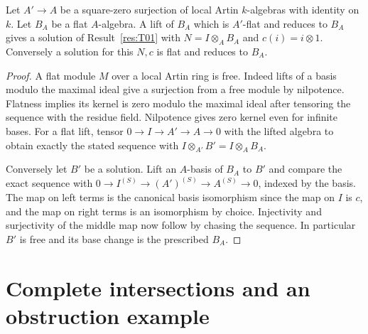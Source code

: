 \begin{lemma}\label{res:T03}
Let \(A'\to A\) be a square-zero surjection of local Artin
\(k\)-algebras with identity on \(k\). Let \(B_A\) be a flat
\(A\)-algebra. A lift of \(B_A\) which is \(A'\)-flat and reduces
to \(B_A\) gives a solution of Result~\ref{res:T01} with
\(N=I\otimes_A B_A\) and \(c(i)=i\otimes1\). Conversely a
solution for this \(N,c\) is flat and reduces to \(B_A\).
\end{lemma}
\begin{proof}
A flat module \(M\) over a local Artin ring is free. Indeed lifts
of a basis modulo the maximal ideal give a surjection from a free
module by nilpotence. Flatness implies its kernel is zero modulo
the maximal ideal after tensoring the sequence with the residue
field. Nilpotence gives zero kernel even for infinite bases.
For a flat lift, tensor \(0\to I\to A'\to A\to0\) with the lifted
algebra to obtain exactly the stated sequence with
\(I\otimes_{A'} B'=I\otimes_A B_A\).

Conversely let \(B'\) be a solution. Lift an \(A\)-basis of \(B_A\)
to \(B'\) and compare the exact sequence with
\(0\to I^{(S)}\to (A')^{(S)}\to A^{(S)}\to0\), indexed by the basis.
The map on left terms is the canonical basis isomorphism since
the map on \(I\) is \(c\), and the map on right terms is an
isomorphism by choice. Injectivity and surjectivity of the middle
map now follow by chasing the sequence. In particular \(B'\)
is free and its base change is the prescribed \(B_A\).
\end{proof}

\section{Complete intersections and an obstruction example}

